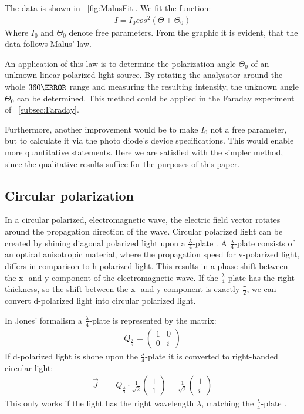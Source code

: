 \documentclass[a4paper,10pt,twocolumn]{article}
\newcommand{\quaterWavePlate}{$\frac{\lambda}{4}$-plate }
\begin{document}
    The data is shown in ~\autoref{fig:MalusFit}.
    We fit the function:
    \begin{align}
        \label{eq:malusFit}
        I = I_0 cos^2(\Theta + \Theta_0)
    \end{align}
     Where $I_0$ and $\Theta_0$ denote free parameters.
    From the graphic it is evident, that the data follows Malus' law.
    
    An application of this law is to determine the polarization angle $\Theta_0$ of an unknown
    linear polarized light source.
    By rotating the analysator around the whole $360\degree$ range and measuring the
    resulting intensity, the unknown angle $\Theta_0$ can be determined.
    This method could be applied in the Faraday experiment of ~\autoref{subsec:Faraday}.
    
    Furthermore, another improvement would be to make $I_0$ not a free parameter, but to calculate it
    via the photo diode's device specifications.
    This would enable more quantitative statements.
    Here we are satisfied with the simpler method,
    since the qualitative results suffice for the purposes of this paper.
    
    \subsection{Circular polarization}
    
    In a circular polarized, electromagnetic wave, the electric field vector rotates around the
    propagation direction of the wave.
    Circular polarized light can be created by shining diagonal polarized light upon a \quaterWavePlate.
    A \quaterWavePlate consists of an optical anisotropic material, where the propagation speed for
    v-polarized light, differs in comparison to h-polarized light.
    This results in a phase shift between the x- and y-component of the electromagnetic wave.
    If the \quaterWavePlate has the right thickness, so the shift between the x- and y-component
    is exactly $\frac{\pi}{2}$, we can convert d-polarized light into circular polarized light.
    
    In Jones' formalism a \quaterWavePlate is represented by the matrix:
    \begin{align*}
        Q_{\frac{\lambda}{4}} = \begin{pmatrix} 1 & 0 \\ 0 & i \end{pmatrix} 
    \end{align*}
    If d-polarized light is shone upon the \quaterWavePlate it is converted to right-handed circular light:
    \begin{align*}
        \vec{J} &= Q_{\frac{\lambda}{4}} \cdot \frac{1}{\sqrt {2}} \begin{pmatrix} 1 \\ 1 \end{pmatrix} =
        \frac{1}{\sqrt {2}} \begin{pmatrix} 1 \\ i \end{pmatrix}
    \end{align*}
    This only works if the light has the right wavelength $\lambda$, matching the 
    \quaterWavePlate.
    
\end{document}
